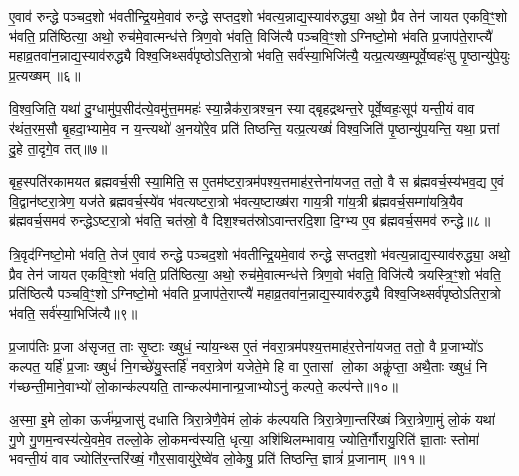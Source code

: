 ए॒वाव॑ रुन्द्धे पञ्चद॒शो भ॑वतीन्द्रि॒यमे॒वाव॑ रुन्द्धे सप्तद॒शो भ॑वत्य॒न्नाद्य॒स्याव॑रुद्ध्या॒ अथो॒ प्रैव तेन॑ जायत एकवि॒ꣳ॒शो भ॑वति॒ प्रति॑ष्ठित्या॒ अथो॒ रुच॑मे॒वात्मन्ध॑त्ते त्रिण॒वो भ॑वति॒ विजि॑त्यै पञ्चवि॒ꣳ॒शोऽग्निष्टो॒मो भ॑वति प्र॒जाप॑ते॒राप्त्यै॑ महाव्र॒तवा॑न॒न्नाद्य॒स्याव॑रुद्ध्यै विश्व॒जिथ्सर्व॑पृष्ठोऽतिरा॒त्रो भ॑वति॒ सर्व॑स्या॒भिजि॑त्यै॒ यत्प्र॒त्यख्ष॒म्पूर्वे॒ष्वहः॑सु पृ॒ष्ठान्यु॑पे॒युः प्र॒त्यख्षम्॥६॥

वि॒श्व॒जिति॒ यथा॑ दु॒ग्धामु॑प॒सीद॑त्ये॒वमु॑त्त॒ममहः॑ स्या॒न्नैक॑रा॒त्रश्च॒न स्याद्बृहद्रथन्त॒रे पूर्वे॒ष्वहः॒सूप॑ यन्ती॒यं वाव र॑थंत॒रम॒सौ बृ॒हदा॒भ्यामे॒व न य॒न्त्यथो॑ अ॒नयो॑रे॒व प्रति॑ तिष्ठन्ति॒ यत्प्र॒त्यख्षं॑ विश्व॒जिति॑ पृ॒ष्ठान्यु॑प॒यन्ति॒ यथा॒ प्रत्तां दु॒हे ता॒दृगे॒व तत्॥७॥

{\anuvakamend[{तेज॑ उपे॒युः प्र॒त्यख्ष॒न्द्विच॑त्वारिशच्च॥२॥}]}

बृह॒स्पति॑रकामयत ब्रह्मवर्च॒सी स्या॒मिति॒ स ए॒तम॑ष्टरा॒त्रम॑पश्य॒त्तमाह॑र॒त्तेना॑यजत॒ ततो॒ वै स ब्र॑ह्मवर्च॒स्य॑भव॒द्य ए॒वं वि॒द्वान॑ष्टरा॒त्रेण॒ यज॑ते ब्रह्मवर्च॒स्ये॑व भ॑वत्यष्टरा॒त्रो भ॑वत्य॒ष्टाख्ष॑रा गाय॒त्री गा॑य॒त्री ब्र॑ह्मवर्च॒सम्गा॑यत्रि॒यैव ब्र॑ह्मवर्च॒समव॑ रुन्द्धेऽष्टरा॒त्रो भ॑वति॒ चत॑स्रो॒ वै दिश॒श्चत॑स्रोऽवान्तरदि॒शा दि॒ग्भ्य ए॒व ब्र॑ह्मवर्च॒समव॑ रुन्द्धे॥८॥

त्रि॒वृद॑ग्निष्टो॒मो भ॑वति॒ तेज॑ ए॒वाव॑ रुन्द्धे पञ्चद॒शो भ॑वतीन्द्रि॒यमे॒वाव॑ रुन्द्धे सप्तद॒शो भ॑वत्य॒न्नाद्य॒स्याव॑रुद्ध्या॒ अथो॒ प्रैव तेन॑ जायत एकवि॒ꣳ॒शो भ॑वति॒ प्रति॑ष्ठित्या॒ अथो॒ रुच॑मे॒वात्मन्ध॑त्ते त्रिण॒वो भ॑वति॒ विजि॑त्यै त्रयस्त्रि॒ꣳ॒शो भ॑वति॒ प्रति॑ष्ठित्यै पञ्चवि॒ꣳ॒शोऽग्निष्टो॒मो भ॑वति प्र॒जाप॑ते॒राप्त्यै॑ महाव्र॒तवा॑न॒न्नाद्य॒स्याव॑रुद्ध्यै विश्व॒जिथ्सर्व॑पृष्ठोऽतिरा॒त्रो भ॑वति॒ सर्व॑स्या॒भिजि॑त्यै॥९॥

{}

प्र॒जाप॑तिः प्र॒जा अ॑सृजत॒ ताः सृ॒ष्टाः ख्षुधं॒ न्या॑य॒न्थ्स ए॒तं न॑वरा॒त्रम॑पश्य॒त्तमाह॑र॒त्तेना॑यजत॒ ततो॒ वै प्र॒जाभ्यो॑ऽ कल्पत॒ यर्\mbox{}हि॑ प्र॒जाः ख्षुधं॑ नि॒गच्छे॑यु॒स्तर्\mbox{}हि॑ नवरा॒त्रेण॑ यजेते॒मे हि वा ए॒तासां लो॒का अकॢ॑प्ता॒ अथै॒ताः ख्षुधं॒ नि ग॑च्छन्ती॒माने॒वाभ्यो॑ लो॒कान्क॑ल्पयति॒ तान्कल्प॑मानान्प्र॒जाभ्योऽनु॑ कल्पते॒ कल्प॑न्ते॥१०॥

अ॒स्मा॒ इ॒मे लो॒का ऊर्ज॑म्प्र॒जासु॑ दधाति त्रिरा॒त्रेणै॒वेमं लो॒कं क॑ल्पयति त्रिरा॒त्रेणा॒न्तरि॑ख्षं त्रिरा॒त्रेणा॒मुं लो॒कं यथा॑ गु॒णे गु॒णम॒न्वस्य॑त्ये॒वमे॒व तल्लो॒के लो॒कमन्व॑स्यति॒ धृत्या॒ अशि॑थिलम्भावाय॒ ज्योति॒र्गौरायु॒रिति॑ ज्ञा॒ताः स्तोमा॑ भवन्ती॒यं वाव ज्योति॑र॒न्तरि॑ख्षं॒ गौर॒सावायु॑रे॒ष्वे॑व लो॒केषु॒ प्रति॑ तिष्ठन्ति॒ ज्ञात्रं॑ प्र॒जानाम्॥११॥

